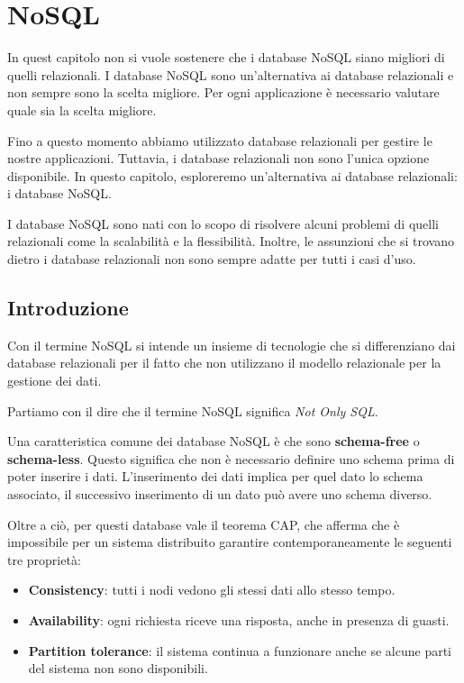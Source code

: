 \chapter{NoSQL}
\begin{nota}
      In quest capitolo non si vuole sostenere che i database NoSQL siano
      migliori di quelli relazionali. I database NoSQL sono un'alternativa
      ai database relazionali e non sempre sono la scelta migliore. Per ogni
      applicazione è necessario valutare quale sia la scelta migliore.
\end{nota}
Fino a questo momento abbiamo utilizzato database relazionali per gestire le
nostre applicazioni. Tuttavia, i database relazionali non sono l'unica
opzione disponibile. In questo capitolo, esploreremo un'alternativa ai
database relazionali: i database NoSQL.

I database NoSQL sono nati con lo scopo di risolvere alcuni problemi di quelli
relazionali come la scalabilità e la flessibilità. Inoltre, le assunzioni che
si trovano dietro i database relazionali non sono sempre adatte per tutti i
casi d'uso.
\section{Introduzione}
Con il termine NoSQL si intende un insieme di tecnologie che si differenziano
dai database relazionali per il fatto che non utilizzano il modello relazionale
per la gestione dei dati.

Partiamo con il dire che il termine NoSQL significa \textit{Not Only SQL}.

Una caratteristica comune dei database NoSQL è che sono \textbf{schema-free} o
\textbf{schema-less}. Questo significa che non è necessario definire uno schema
prima di poter inserire i dati. L'inserimento dei dati implica per quel dato lo
schema associato, il successivo inserimento di un dato può avere uno schema diverso.

Oltre a ciò, per questi database vale il teorema CAP, che afferma che è
impossibile per un sistema distribuito garantire contemporaneamente le seguenti
tre proprietà:
\begin{itemize}
      \item \textbf{Consistency}: tutti i nodi vedono gli stessi dati allo stesso
            tempo.
      \item \textbf{Availability}: ogni richiesta riceve una risposta, anche in
            presenza di guasti.
      \item \textbf{Partition tolerance}: il sistema continua a funzionare anche
            se alcune parti del sistema non sono disponibili.
\end{itemize}

